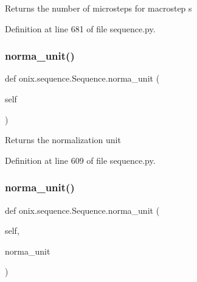 \begin{DoxyVerb}Returns the number of microsteps for macrostep s\end{DoxyVerb}
 

Definition at line 681 of file sequence.\+py.

\mbox{\label{classonix_1_1sequence_1_1Sequence_a180c5c6bfafa1bceabce0c8365fb36f0}} 
\subsubsection{\texorpdfstring{norma\+\_\+unit()}{norma\_unit()}\hspace{0.1cm}{\footnotesize\ttfamily [1/2]}}
{\footnotesize\ttfamily def onix.\+sequence.\+Sequence.\+norma\+\_\+unit (\begin{DoxyParamCaption}\item[{}]{self }\end{DoxyParamCaption})}

\begin{DoxyVerb}Returns the normalization unit\end{DoxyVerb}
 

Definition at line 609 of file sequence.\+py.

\mbox{\label{classonix_1_1sequence_1_1Sequence_ab1965b8fda8d2c9fbc69fd075825380f}} 
\subsubsection{\texorpdfstring{norma\+\_\+unit()}{norma\_unit()}\hspace{0.1cm}{\footnotesize\ttfamily [2/2]}}
{\footnotesize\ttfamily def onix.\+sequence.\+Sequence.\+norma\+\_\+unit (\begin{DoxyParamCaption}\item[{}]{self,  }\item[{}]{norma\+\_\+unit }\end{DoxyParamCaption})}

